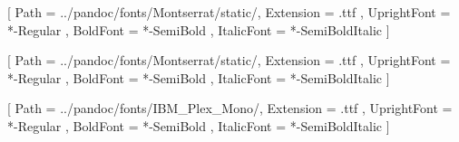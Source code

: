 
\makeatother
\usepackage{fontspec}



\setmainfont{Montserrat}[
Path = ../pandoc/fonts/Montserrat/static/,
Extension = .ttf ,
UprightFont = *-Regular ,
BoldFont = *-SemiBold ,
ItalicFont = *-SemiBoldItalic
]

\setsansfont{Montserrat}[
Path = ../pandoc/fonts/Montserrat/static/,
Extension = .ttf ,
UprightFont = *-Regular ,
BoldFont = *-SemiBold ,
ItalicFont = *-SemiBoldItalic
]


\setmonofont{IBMPlexMono}[
Path = ../pandoc/fonts/IBM_Plex_Mono/,
Extension = .ttf ,
UprightFont = *-Regular ,
BoldFont = *-SemiBold ,
ItalicFont = *-SemiBoldItalic
]

\usepackage{pgf-umlcd}
\usepackage{array}
\usepackage{easybmat}
\usepackage{tikz}

\usetikzlibrary{positioning}
\usetikzlibrary{matrix,calc,tikzmark,arrows,shapes,backgrounds}
\usetikzlibrary{fit, arrows.meta, shapes}        


